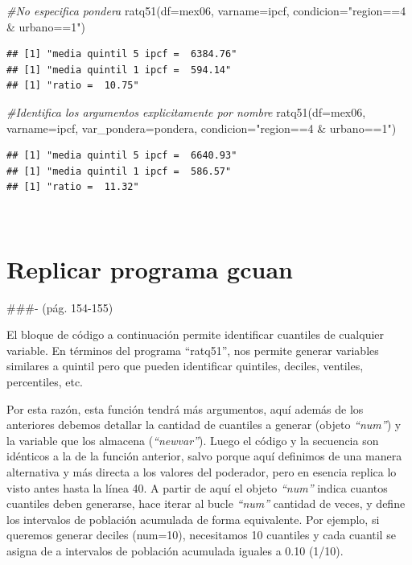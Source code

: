 \documentclass[
]{book}
\newenvironment{Shaded}{\begin{snugshade}}{\end{snugshade}}
\newcommand{\AttributeTok}[1]{\textcolor[rgb]{0.77,0.63,0.00}{#1}}
\newcommand{\CommentTok}[1]{\textcolor[rgb]{0.56,0.35,0.01}{\textit{#1}}}
\newcommand{\FunctionTok}[1]{\textcolor[rgb]{0.00,0.00,0.00}{#1}}
\newcommand{\NormalTok}[1]{#1}
\newcommand{\StringTok}[1]{\textcolor[rgb]{0.31,0.60,0.02}{#1}}
\begin{document}
\begin{Shaded}
\begin{Highlighting}[]
\CommentTok{\#No especifica pondera}
\FunctionTok{ratq51}\NormalTok{(}\AttributeTok{df=}\NormalTok{mex06, }\AttributeTok{varname=}\NormalTok{ipcf, }\AttributeTok{condicion=}\StringTok{"region==4 \& urbano==1"}\NormalTok{)  }
\end{Highlighting}
\end{Shaded}

\begin{verbatim}
## [1] "media quintil 5 ipcf =  6384.76"
## [1] "media quintil 1 ipcf =  594.14"
## [1] "ratio =  10.75"
\end{verbatim}

\begin{Shaded}
\begin{Highlighting}[]
\CommentTok{\#Identifica los argumentos explicitamente por nombre }
\FunctionTok{ratq51}\NormalTok{(}\AttributeTok{df=}\NormalTok{mex06, }\AttributeTok{varname=}\NormalTok{ipcf, }\AttributeTok{var\_pondera=}\NormalTok{pondera, }\AttributeTok{condicion=}\StringTok{"region==4 \& urbano==1"}\NormalTok{) }
\end{Highlighting}
\end{Shaded}

\begin{verbatim}
## [1] "media quintil 5 ipcf =  6640.93"
## [1] "media quintil 1 ipcf =  586.57"
## [1] "ratio =  11.32"
\end{verbatim}

~

\hypertarget{replicar-programa-gcuan}{%
\section{Replicar programa gcuan}\label{replicar-programa-gcuan}}

\#\#\#- (pág. 154-155)

El bloque de código a continuación permite identificar cuantiles de cualquier variable. En términos del programa ``ratq51'', nos permite generar variables similares a quintil pero que pueden identificar quintiles, deciles, ventiles, percentiles, etc.

Por esta razón, esta función tendrá más argumentos, aquí además de los anteriores debemos detallar la cantidad de cuantiles a generar (objeto \emph{``num''}) y la variable que los almacena (\emph{``newvar''}). Luego el código y la secuencia son idénticos a la de la función anterior, salvo porque aquí definimos de una manera alternativa y más directa a los valores del poderador, pero en esencia replica lo visto antes hasta la línea 40. A partir de aquí el objeto \emph{``num''} indica cuantos cuantiles deben generarse, hace iterar al bucle \emph{``num''} cantidad de veces, y define los intervalos de población acumulada de forma equivalente. Por ejemplo, si queremos generar deciles (num=10), necesitamos 10 cuantiles y cada cuantil se asigna de a intervalos de población acumulada iguales a 0.10 (1/10).
\end{document}
